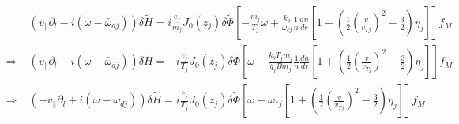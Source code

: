 \documentclass[12pt]{article}
\numberwithin{equation}{section}
\begin{document}
   \begin{equation}
   \begin{aligned}
      &(v_\parallel\partial_l - i(\omega - \bar{\omega}_{dj}))\delta\widetilde{H} = i\frac{e_j}{m_j}J_0(z_j)\delta\widetilde{\Phi}
      [-\frac{m_j}{T_j}\omega + \frac{k_\theta}{\omega_{cj}}\frac{1}{n}\frac{dn}{dr}[1 + (\frac{1}{2}\left(\frac{v}{v_{Tj}}\right)^2
                                                                                     - \frac{3}{2})\eta_j]]f_M \\
      \Rightarrow\; &(v_\parallel\partial_l - i(\omega - \bar{\omega}_{dj}))\delta\widetilde{H} = -i\frac{e_j}{T_j}J_0(z_j)\delta\widetilde{\Phi}
      [\omega - \frac{k_\theta T_j m_j}{q_j B m_j}\frac{1}{n}\frac{dn}{dr}[1 + (\frac{1}{2}\left(\frac{v}{v_{Tj}}\right)^2
                                                                                     - \frac{3}{2})\eta_j]]f_M \\
      \Rightarrow\; &(-v_\parallel\partial_l + i(\omega - \bar{\omega}_{dj}))\delta\widetilde{H} = i\frac{e_j}{T_j}J_0(z_j)\delta\widetilde{\Phi}
      [\omega - \omega_{*j}[1 + (\frac{1}{2}\left(\frac{v}{v_{Tj}}\right)^2- \frac{3}{2})\eta_j]]f_M
   \end{aligned}
   \end{equation}
\end{document}
